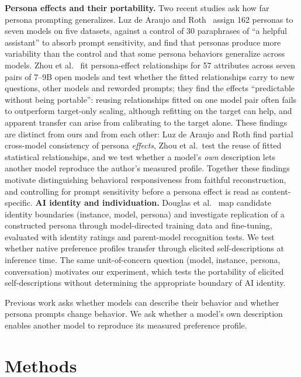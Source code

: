 \documentclass[11pt]{article}
\begin{document}
\textbf{Persona effects and their portability.} Two recent studies ask
how far persona prompting generalizes. Luz de Araujo and
Roth~\cite{luzdearaujo} assign 162 personas to seven models on five
datasets, against a control of 30 paraphrases of ``a helpful assistant'' to
absorb prompt sensitivity, and find that personas produce more variability
than the control and that some persona behaviors generalize across models.
Zhou et al.~\cite{zhou2026} fit persona-effect relationships for 57
attributes across seven pairs of 7--9B open models and test whether the
fitted relationships carry to new questions, other models and reworded
prompts; they find the effects ``predictable without being portable'':
reusing relationships fitted on one model pair often fails to outperform
target-only scaling, although refitting on the target can help, and
apparent transfer can arise from calibrating to the target alone. These
findings are distinct from ours and from each other: Luz de Araujo and Roth
find partial cross-model consistency of persona \emph{effects}, Zhou et al.\
test the reuse of fitted statistical relationships, and we test whether a
model's \emph{own} description lets another model reproduce the author's
measured profile. Together these findings motivate distinguishing
behavioral responsiveness from faithful reconstruction, and controlling for
prompt sensitivity before a persona effect is read as content-specific.
\textbf{AI identity and individuation.} Douglas et al.~\cite{douglas} map
candidate identity boundaries (instance, model, persona) and investigate
replication of a constructed persona through model-directed training data
and fine-tuning, evaluated with identity ratings and parent-model
recognition tests. We test whether native preference profiles transfer
through elicited self-descriptions at inference time. The same
unit-of-concern question (model, instance, persona, conversation) motivates
our experiment, which tests the portability of elicited self-descriptions
without determining the appropriate boundary of AI identity.

Previous work asks whether models can describe their behavior and whether
persona prompts change behavior. We ask whether a model's own description
enables another model to reproduce its measured preference profile.

\section{Methods}
\end{document}
